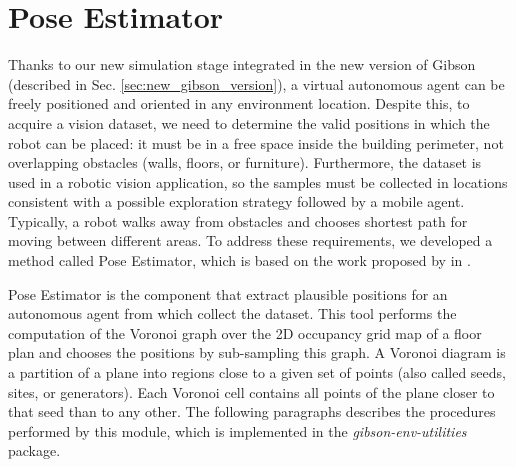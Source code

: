 \section{Pose Estimator}

Thanks to our new simulation stage integrated in the new version of Gibson (described in Sec. \ref{sec:new_gibson_version}), a virtual autonomous agent can be freely positioned and oriented in any environment location. Despite this, to acquire a vision dataset, we need to determine the valid positions in which the robot can be placed: it must be in a free space inside the building perimeter, not overlapping obstacles (walls, floors, or furniture). Furthermore, the dataset is used in a robotic vision application, so the samples must be collected in locations consistent with a possible exploration strategy followed by a mobile agent. Typically, a robot walks away from obstacles and chooses shortest path for moving between different areas. To address these requirements, we developed a method called Pose Estimator, which is based on the work proposed by \citeauthor{repeatabilityslamarxiv} in \cite{repeatabilityslamarxiv, repeatabilityslam}.

Pose Estimator is the component that extract plausible positions for an autonomous agent from which collect the dataset. This tool performs the computation of the Voronoi graph over the 2D occupancy grid map \cite{cuupancygridfirst} of a floor plan and chooses the positions by sub-sampling this graph. A Voronoi diagram is a partition of a plane into regions close to a given set of points (also called seeds, sites, or generators). Each Voronoi cell contains all points of the plane closer to that seed than to any other. The following paragraphs describes the procedures performed by this module, which is implemented in the \textit{gibson-env-utilities} package.



